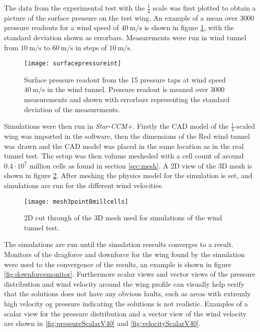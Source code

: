   The data from the experimental test with the $\frac{1}{4}$ scale was first plotted to obtain a picture of the surface pressure on the test wing. An example of a mean over 3000 pressure readouts for a wind speed of $\SI{40}{\metre\per\second}$ is shown in figure \ref{fig:surfacepressureint}, with the standard deviation shown as errorbars. Measurements were run in wind tunnel from $\SI{10}{\metre\per\second}$ to $\SI{60}{\metre\per\second}$ in steps of $\SI{10}{\metre\per\second}$.

  \begin{figure}
    \texttt{[image: surfacepressureint]}
    \caption{Surface pressure readout from the 15 pressure taps at wind speed $\SI{40}{\metre\per\second}$ in the wind tunnel. Pressure readout is meaned over 3000 measurements and shown with errorbars representing the standard deviation of the measurements.}
    \label{fig:surfacepressureint}
  \end{figure}

  Simulations were then run in \emph{Star-CCM+}. Firstly the CAD model of the $\frac{1}{4}$-scaled wing was imported in the software, then the dimensions of the Red wind tunnel was drawn and the CAD model was placed in the same location as in the real tunnel test. The setup was then volume mesheded with a cell count of around $0.4 \cdot 10^{7}$ million cells as found in section \ref{sec:mesh}. A 2D view of the 3D mesh is shown in figure \ref{fig:mesh3point8mill}. After meshing the physics model for the simulation is set, and simulations are run for the different wind velocities.

  \begin{figure}
    \texttt{[image: mesh3point8millcells]}
    \caption{2D cut through of the 3D mesh used for simulations of the wind tunnel test.}
    \label{fig:mesh3point8mill}
  \end{figure}

  The simulations are run until the simulation reseults converges to a result. Monitors of the dragforce and downforce for the wing found by the simulation were used to the convergence of the results, an example is shown in figure \ref{fig:downforcemonitor}. Furthermore scalar views and vector views of the pressure distribution and wind velocity around the wing profile can visually help verify that the solutions does not have any obvious faults, such as areas with extremly high velocity og pressure indicating the solutions is not realistic. Examples of a scalar view for the pressure distribution and a vector view of the wind velocity are shown in \ref{fig:pressureScalarV40} and \ref{fig:velocityScalarV40}.

